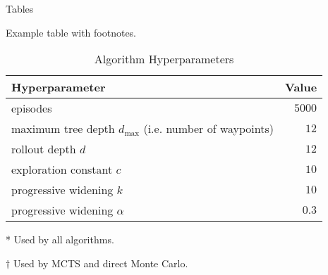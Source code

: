 \begin{frame}{Tables}

Example table with footnotes.

\begin{table}[!t]
    \centering
    \caption{\label{tab:mcts_params} Algorithm Hyperparameters}
    \begin{threeparttable}
    \begin{tabular}{@{}lr@{}}
        \toprule
        \textbf{Hyperparameter} & \textbf{Value} \\
        \midrule
        episodes\tnote{*} & $5000$ \\
        maximum tree depth $d_\text{max}$ (i.e. number of waypoints)\tnote{*} & $12$ \\
        rollout depth $d$ \tnote{$\dagger$} & $12$ \\
        exploration constant $c$ & $10$ \\
        progressive widening $k$ & $10$ \\
        progressive widening $\alpha$ & $0.3$ \\
        \bottomrule
    \end{tabular}
    \begin{tablenotes}
        \scriptsize
        \item[*] {Used by all algorithms.}
        \item[$\dagger$] {Used by MCTS and direct Monte Carlo.}
    \end{tablenotes}
    \end{threeparttable}
\end{table}

\end{frame}